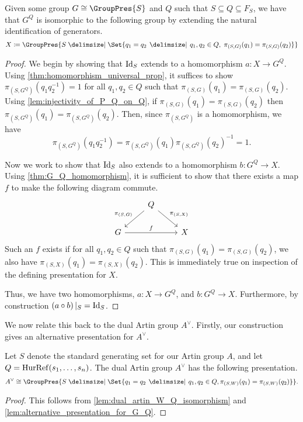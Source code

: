 \begin{lemma}
	\label{lem:alternative_presentation_for_G_Q}
	Given some group $G \cong \GroupPres{S}$ and $Q$ such that $S \subseteq Q \subseteq F_S$, we have that $G^Q$ is isomorphic to the following group by extending the natural identification of generators.
	\begin{equation}
		X \coloneqq \GroupPres{S \relations \Set{q_1 = q_2 \given q_1,q_2 \in Q, \; \pi_{(S,G) }(q_1) = \pi_{(S,G)}(q_2)}}
	\end{equation}
\end{lemma}
\begin{proof}
	We begin by showing that $\operatorname{Id}_S$ extends to a homomorphism $a \colon X \to G^Q$.
	Using \cref{thm:homomorphism_universal_prop}, it suffices to show $\pi_{\left(S,G^Q\right)}(q_1q_2^{-1}) = 1$ for all $q_1,q_2 \in Q$ such that $\pi_{(S,G)}(q_1) = \pi_{(S,G)}(q_2)$.
	Using \cref{lem:injectivity_of_P_Q_on_Q}, if $\pi_{(S,G)}(q_1) = \pi_{(S,G)}(q_2)$ then $\pi_{\left(S,G^Q\right)}(q_1) = \pi_{\left(S,G^Q\right)}(q_2)$.
	Then, since $\pi_{\left(S,G^Q\right)}$ is a homomorphism, we have
	\[
		\pi_{(S,G^Q)}\left(q_1q_2^{-1}\right) = \pi_{(S,G^Q)}(q_1)\pi_{(S,G^Q)}(q_2)^{-1} = 1
		.\]

	Now we work to show that $\operatorname{Id}_S$ also extends to a homomorphism $b \colon G^Q \to X$.
	Using \cref{thm:G_Q_homomorphism}, it is sufficient to show that there exists a map $f$ to make the following diagram commute.
	\begin{equation*}
		\begin{tikzcd}
			& Q \ar[dl, "\pi_{(S,G)}"'] \ar[dr, "\pi_{(S,X)}"] &
			\\ G \ar[rr, "f"] & & X
		\end{tikzcd}
	\end{equation*}
	Such an $f$ exists if for all $q_1,q_2 \in Q$ such that $\pi_{\left( S,G \right)} (q_1) = \pi_{\left( S,G \right)} (q_2)$, we also have $\pi_{\left( S,X \right) }(q_1) = \pi_{\left( S,X \right) }(q_2)$.
	This is immediately true on inspection of the defining presentation for $X$.

	Thus, we have two homomorphisms, $a \colon X \to G^Q$, and $b \colon G^Q \to X$.
	Furthermore, by construction $\left( a \circ b \right) |_S = \operatorname{Id}_S$.
\end{proof}
We now relate this back to the dual Artin group $A^\vee$.
Firstly, our construction gives an alternative presentation for $A^\vee$.
\begin{corollary}
	Let $S$ denote the standard generating set for our Artin group $A$, and let $Q= \operatorname{HurRef}(s_1,\ldots,s_n)$.
	The dual Artin group $A^\vee$ has the following presentation.
	\[
		A^\vee \cong \GroupPres{S \relations \Set{ q_1 = q_2 \given q_1,q_2 \in Q, \pi_{(S,W)}(q_1)=\pi_{(S,W)}(q_2)}}
		.\]
\end{corollary}
\begin{proof}
	This follows from \cref{lem:dual_artin_W_Q_isomorphism} and \cref{lem:alternative_presentation_for_G_Q}.
\end{proof}

